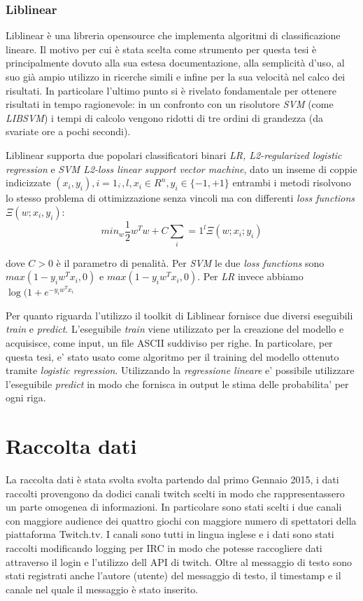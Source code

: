 \documentclass[a4paper,12pt,openright,twoside]{report}
\theoremstyle{definition}
\begin{document}
\subsection{Liblinear}
Liblinear è una libreria opensource che implementa algoritmi di classificazione lineare. Il motivo
per cui è stata scelta come strumento per questa
tesi è principalmente dovuto alla sua estesa documentazione, alla semplicità
d'uso, al suo già ampio utilizzo in ricerche simili e infine per la sua velocità nel calco dei risultati. 
In particolare l'ultimo punto si è rivelato fondamentale
per ottenere risultati in tempo ragionevole: in un confronto con un risolutore \emph{SVM} (come \emph{LIBSVM})
i tempi di calcolo vengono ridotti di tre ordini di grandezza (da svariate ore a pochi secondi).

Liblinear supporta due popolari classificatori binari \emph{LR, L2-regularized logistic regression} e 
\emph{SVM L2-loss linear support vector machine}, dato un inseme di coppie
indicizzate $(x_i,y_i),i=1,\dot{},l,x_i\in R^n, y_i \in \{-1,+1\}$ entrambi i metodi risolvono lo stesso
problema di ottimizzazione senza vincoli ma con differenti \emph{loss functions} $\Xi(w;x_i,y_i)$:
\begin{equation}
	min_w \frac{1}{2}w^Tw+C\sum_i=1^l\Xi(w;x_i;y_i)
	\label{eqn:liblinear1}
\end{equation}

dove $C > 0$ è il parametro di penalità. Per \emph{SVM} le due \emph{loss functions} sono $max(1-y_iw^Tx_i,0)$ e
$max(1-y_iw^Tx_i,0)$. Per \emph{LR} invece abbiamo $\log(1+e^{-y_iw^Tx_i}$

Per quanto riguarda l'utilizzo il toolkit di Liblinear fornisce due diversi eseguibili \emph{train} e 
\emph{predict}.
L'eseguibile \emph{train} viene utilizzato per la creazione del modello e acquisisce, come input, un file
ASCII suddiviso per righe. In particolare, per questa tesi, e' stato usato come algoritmo 
per il training del modello ottenuto tramite \emph{logistic regression}.
Utilizzando la \emph{regressione lineare} e' possibile utilizzare l'eseguibile \emph{predict} in modo 
che fornisca in output le stima delle probabilita' per ogni riga.

\chapter{Raccolta dati}
La raccolta dati è stata svolta svolta partendo dal primo Gennaio 2015, i dati raccolti provengono da dodici canali twitch scelti in modo che rappresentassero un parte omogenea di informazioni.
In particolare sono stati scelti i due canali con maggiore audience dei quattro giochi con maggiore numero di spettatori della piattaforma Twitch.tv.
I canali sono tutti in lingua inglese e i dati sono stati raccolti modificando logging per IRC  in modo che potesse raccogliere dati attraverso il login e l'utilizzo dell API di twitch.
Oltre al messaggio di testo sono stati registrati anche l'autore (utente) del messaggio di testo, il timestamp e il canale nel quale il messaggio è stato inserito.
\end{document}
